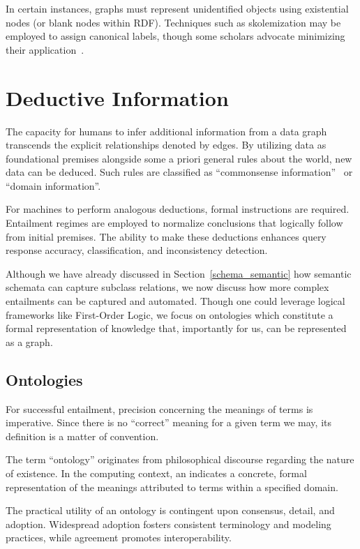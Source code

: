In certain instances, graphs must represent unidentified objects using existential nodes (or blank nodes within RDF). Techniques such as skolemization may be employed to assign canonical labels, though some scholars advocate minimizing their application~\cite{Cyganiak2014rdf, Hogan2017CanonicalFormsIsomorphicEquivalentRDFGraphs, Longley2019RDFDatasetNormalization}.

\section{Deductive Information}\label{deductive-information}
The capacity for humans to infer additional information from a data graph transcends the explicit relationships denoted by edges. By utilizing data as foundational premises alongside some a priori general rules about the world, new data can be deduced. Such rules are classified as ``commonsense information''~\cite{McCarthy1990FomalizingCommonsense} or ``domain information''.

For machines to perform analogous deductions, formal instructions are required. Entailment regimes are employed to normalize conclusions that logically follow from initial premises. The ability to make these deductions enhances query response accuracy, classification, and inconsistency detection.

Although we have already discussed in Section~\ref{schema_semantic} how semantic schemata can capture subclass relations, we now discuss how more complex entailments can be captured and automated. Though one could leverage logical frameworks like First-Order Logic, we focus on ontologies which constitute a formal representation of knowledge that, importantly for us, can be represented as a graph.

\subsection{Ontologies}\label{ontologies}
For successful entailment, precision concerning the meanings of terms is imperative. Since there is no ``correct'' meaning for a given term we may, its definition is a matter of convention.

The term ``ontology'' originates from philosophical discourse regarding the nature of existence. In the computing context, an  indicates a concrete, formal representation of the meanings attributed to terms within a specified domain.

The practical utility of an ontology is contingent upon consensus, detail, and adoption. Widespread adoption fosters consistent terminology and modeling practices, while agreement promotes interoperability.

